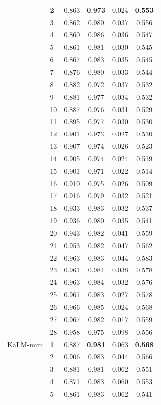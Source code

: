 \begin{longtable}{llcccc}
 & \textbf{2} & 0.863 & \textbf{0.973} & 0.024 & \textbf{0.553} \\
 & 3 & 0.862 & 0.980 & 0.037 & 0.556 \\
 & 4 & 0.860 & 0.986 & 0.036 & 0.547 \\
 & 5 & 0.861 & 0.981 & 0.030 & 0.545 \\
 & 6 & 0.867 & 0.983 & 0.035 & 0.545 \\
 & 7 & 0.876 & 0.980 & 0.033 & 0.544 \\
 & 8 & 0.882 & 0.972 & 0.037 & 0.532 \\
 & 9 & 0.881 & 0.977 & 0.034 & 0.532 \\
 & 10 & 0.887 & 0.976 & 0.031 & 0.529 \\
 & 11 & 0.895 & 0.977 & 0.030 & 0.530 \\
 & 12 & 0.901 & 0.973 & 0.027 & 0.530 \\
 & 13 & 0.907 & 0.974 & 0.026 & 0.523 \\
 & 14 & 0.905 & 0.974 & 0.024 & 0.519 \\
 & 15 & 0.901 & 0.971 & 0.022 & 0.514 \\
 & 16 & 0.910 & 0.975 & 0.026 & 0.509 \\
 & 17 & 0.916 & 0.979 & 0.032 & 0.521 \\
 & 18 & 0.933 & 0.983 & 0.032 & 0.537 \\
 & 19 & 0.936 & 0.980 & 0.035 & 0.541 \\
 & 20 & 0.943 & 0.982 & 0.041 & 0.559 \\
 & 21 & 0.953 & 0.982 & 0.047 & 0.562 \\
 & 22 & 0.963 & 0.983 & 0.044 & 0.583 \\
 & 23 & 0.961 & 0.984 & 0.038 & 0.578 \\
 & 24 & 0.963 & 0.984 & 0.032 & 0.576 \\
 & 25 & 0.961 & 0.983 & 0.027 & 0.578 \\
 & 26 & 0.966 & 0.985 & 0.024 & 0.568 \\
 & 27 & 0.967 & 0.982 & 0.017 & 0.559 \\
 & 28 & 0.958 & 0.975 & 0.098 & 0.556 \\
\midrule
KaLM-mini & \textbf{1} & 0.887 & \textbf{0.981} & 0.063 & \textbf{0.568} \\
 & 2 & 0.906 & 0.983 & 0.044 & 0.566 \\
 & 3 & 0.881 & 0.981 & 0.062 & 0.551 \\
 & 4 & 0.871 & 0.983 & 0.060 & 0.553 \\
 & 5 & 0.861 & 0.983 & 0.062 & 0.541 \\

\end{longtable}
